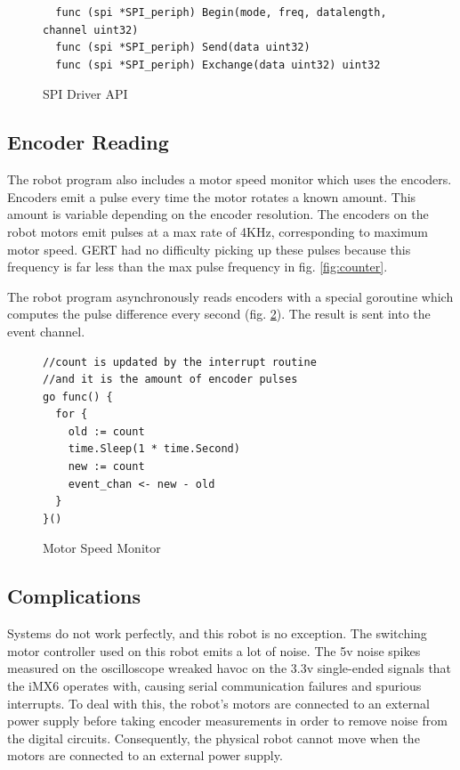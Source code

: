\begin{figure}[h]
  \begin{lstlisting}
  func (spi *SPI_periph) Begin(mode, freq, datalength, channel uint32)
  func (spi *SPI_periph) Send(data uint32)
  func (spi *SPI_periph) Exchange(data uint32) uint32
  \end{lstlisting}
  \caption{SPI Driver API} \label{fig:spi_api}
\end{figure}


\subsection{Encoder Reading}
The robot program also includes a motor speed monitor which uses the encoders.
Encoders emit a pulse every time the motor rotates a known amount. This amount is variable depending on the
encoder resolution. The encoders on the robot motors emit pulses at a max rate of 4KHz, corresponding to
maximum motor speed. GERT had no difficulty picking up these pulses because this frequency is far less than
the max pulse frequency in fig. \ref{fig:counter}.

The robot program asynchronously reads encoders with a special goroutine which computes the pulse difference
every second (fig. \ref{fig:speedmon}). The result is sent into the event channel.

\begin{figure}[h]
\begin{center}
\begin{lstlisting}
//count is updated by the interrupt routine
//and it is the amount of encoder pulses
go func() {
  for {
    old := count
    time.Sleep(1 * time.Second)
    new := count
    event_chan <- new - old
  }
}()
\end{lstlisting}
\end{center}
  \caption{Motor Speed Monitor} \label{fig:speedmon}
\end{figure}

\subsection{Complications}
Systems do not work perfectly, and this robot is no exception. The switching motor controller used
on this robot emits a lot of noise. The 5v noise spikes measured on the oscilloscope wreaked havoc
on the 3.3v single-ended signals that the iMX6 operates with, causing serial communication failures
and spurious interrupts. To deal with this, the robot's motors are connected to an external power supply before
taking encoder measurements in order to remove noise from the digital circuits. Consequently, the physical
robot cannot move when the motors are connected to an external power supply.

